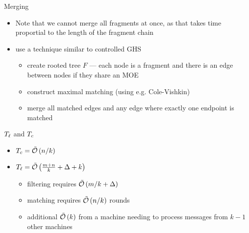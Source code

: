 \begin{frame}{Merging}
    \begin{itemize}
        \item Note that we cannot merge all fragments at once, as that takes time proportial to the length of the fragment chain
        \item use a technique similar to \alert{controlled GHS}
              \begin{itemize}
                  \item create rooted tree $F$ --- each node is a fragment and there is an edge between nodes if they share an MOE
                  \item construct maximal matching (using e.g. Cole-Vishkin)
                  \item merge all matched edges and any edge where \alert{exactly} one
                        endpoint is matched
              \end{itemize}
    \end{itemize}
\end{frame}

\begin{frame}{$T_{\ell}$ and $T_c$}
    \begin{itemize}
        \item $T_c = \tilde{\mathcal{O}}\left(n / k\right)$ 
        \item $T_{\ell} = \tilde{\mathcal{O}}\left(\frac{m+n}{k} + \Delta + k\right)$
              \begin{itemize}
                  \item filtering requires $\tilde{\mathcal{O}}\left(m / k + \Delta\right)$
                  \item matching requires $\tilde{\mathcal{O}}\left(n / k\right)$ rounds
                  \item additional $\tilde{\mathcal{O}}\left(k\right)$ from a machine needing to process messages
                  from $k - 1$ other machines
              \end{itemize}
    \end{itemize}
\end{frame}